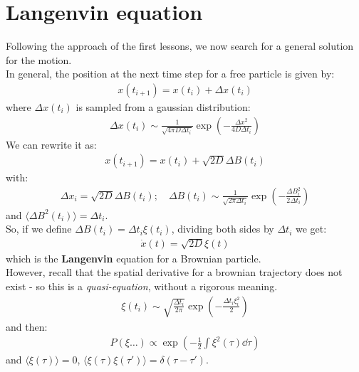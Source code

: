 \documentclass[../template.tex]{subfiles}
\begin{document}
\section{Langenvin equation}
Following the approach of the first lessons, we now search for a general solution for the motion.\\
In general, the position at the next time step for a free particle is given by:
\begin{align*}
    x(t_{i+1}) = x(t_i) + \Delta x(t_i)
\end{align*}
where $\Delta x(t_i)$ is sampled from a gaussian distribution:
\begin{align*}
    \Delta x(t_i) \sim \frac{1}{\sqrt{4 \pi D \Delta t_i}} \exp\left(-\frac{\Delta x^2}{4 D \Delta t_i } \right)
\end{align*} 
We can rewrite it as:
\begin{align*}
    x(t_{i+1}) = x(t_i) + \sqrt{2D } \Delta B(t_i)
\end{align*}
with:
\begin{align*}
    \Delta x_i = \sqrt{2D} \Delta B(t_i); \quad \Delta B(t_i) \sim \frac{1}{\sqrt{2 \pi \Delta t_i}} \exp\left(-\frac{\Delta B_i^2}{2 \Delta t_i} \right) 
\end{align*}
and $\langle \Delta B^2 (t_i) \rangle = \Delta t_i$.\\
So, if we define $\Delta B(t_i) = \Delta t_i \xi(t_i)$, dividing both sides by $\Delta t_i$ we get:
\begin{align*}
    \dot{x}(t) = \sqrt{2D} \xi(t)
\end{align*}    
which is the \textbf{Langenvin} equation for a Brownian particle.\\
However, recall that the spatial derivative for a brownian trajectory does not exist - so this is a \textit{quasi-equation}, without a rigorous meaning.
\begin{align*}
    \xi(t_i) \sim \sqrt{\frac{\Delta t_i}{2 \pi} } \exp\left(-\frac{\Delta t_i \xi_i^2}{2 } \right)
\end{align*}  
and then:
\begin{align*}
    P(\xi \dots ) \propto \exp\left(-\frac{1}{2} \int \xi^2 (\tau) \dd{\tau} \right)
\end{align*}
and $\langle \xi(\tau) \rangle = 0$, $\langle \xi (\tau) \xi (\tau') \rangle = \delta(\tau - \tau')$.
\end{document}
